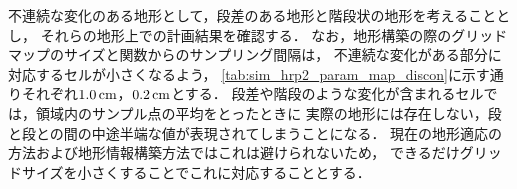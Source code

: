 \documentclass[autodetect-engine,dvipdfmx-if-dvi,ja=standard,a4j,jbase=11pt,magstyle=nomag*]{bxjsreport}
\begin{document}
不連続な変化のある地形として，段差のある地形と階段状の地形を考えることとし，
それらの地形上での計画結果を確認する．
なお，地形構築の際のグリッドマップのサイズと関数からのサンプリング間隔は，
不連続な変化がある部分に対応するセルが小さくなるよう，
\cref{tab:sim_hrp2_param_map_discon}に示す通りそれぞれ$1.0\,\si{\centi\meter}$，$0.2\,\si{\centi\meter}$とする．
段差や階段のような変化が含まれるセルでは，領域内のサンプル点の平均をとったときに
実際の地形には存在しない，段と段との間の中途半端な値が表現されてしまうことになる．
現在の地形適応の方法および地形情報構築方法ではこれは避けられないため，
できるだけグリッドサイズを小さくすることでこれに対応することとする．

\end{document}

